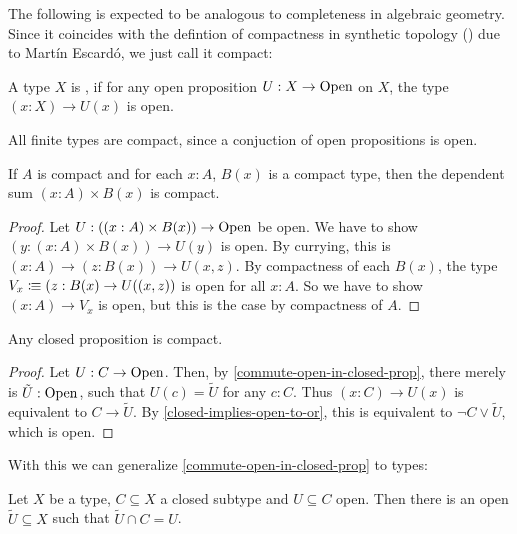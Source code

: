
The following is expected to be analogous to completeness in algebraic geometry.
Since it coincides with the defintion of compactness in synthetic topology (\cite{MISSING}) due to Martín Escardó,
we just call it compact:

\begin{definition}
  A type $X$ is ,
  if for any open proposition $U:X\to\mathrm{Open}$ on $X$,
  the type $(x:X)\to U(x)$ is open.
\end{definition}

\begin{example}
  All finite types are compact, since a conjuction of open propositions is open.
\end{example}

\begin{lemma}
  \label{dependent-sum-compact}
  If $A$ is compact and for each $x:A$, $B(x)$ is a compact type,
  then the dependent sum $(x:A)\times B(x)$ is compact.
\end{lemma}

\begin{proof}
  Let $U:((x:A)\times B(x))\to\mathrm{Open}$ be open.
  We have to show $(y:(x:A)\times B(x))\to U(y)$ is open.
  By currying, this is $(x:A)\to (z:B(x))\to U(x,z)$.
  By compactness of each $B(x)$, the type $V_x\vcentcolon\mspace{-1.2mu}\equiv (z:B(x)\to U((x,z))$ is open for all $x:A$.
  So we have to show $(x:A)\to V_x$ is open, but this is the case by compactness of $A$.
\end{proof}

\begin{lemma}
  \label{closed-proposition-compact}
  Any closed proposition is compact.
\end{lemma}

\begin{proof}
  Let $U:C\to\mathrm{Open}$.
  Then, by \cref{commute-open-in-closed-prop},
  there merely is $\tilde{U}:\mathrm{Open}$,
  such that $U(c) = \tilde{U}$ for any $c : C$.
  Thus $(x : C) \to U(x)$ is equivalent to $C \to \tilde U$.
  By \cref{closed-implies-open-to-or}, this is equivalent to $\neg C\vee \tilde{U}$,
  which is open.
\end{proof}

With this we can generalize \cref{commute-open-in-closed-prop} to types:

\begin{proposition}
  \label{commute-open-in-closed}
  Let $X$ be a type, $C\subseteq X$ a closed subtype and $U\subseteq C$ open.
  Then there is an open $\tilde{U}\subseteq X$ such that $\tilde{U}\cap C = U$.
\end{proposition}

